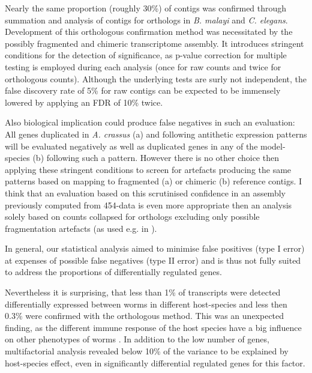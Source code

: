 Nearly the same proportion (roughly 30\%) of contigs was confirmed
through summation and analysis of contigs for orthologs in
\textit{B. malayi} and \textit{C. elegans}. Development of this
orthologous confirmation method was necessitated by the possibly
fragmented and chimeric transcriptome assembly. It introduces
stringent conditions for the detection of significance, as p-value
correction for multiple testing is employed during each analysis (once
for raw counts and twice for orthologous counts). Although the
underlying tests are surly not independent, the false discovery rate
of 5\% for raw contigs can be expected to be immensely lowered by
applying an FDR of 10\% twice.

Also biological implication could produce false negatives in such an
evaluation: All genes duplicated in \textit{A. crassus} (a) and
following antithetic expression patterns will be evaluated negatively
as well as duplicated genes in any of the model-species (b) following
such a pattern. However there is no other choice then applying these
stringent conditions to screen for artefacts producing the same
patterns based on mapping to fragmented (a) or chimeric (b) reference
contigs. I think that an evaluation based on this scrutinised
confidence in an assembly previously computed from 454-data is even
more appropriate then an analysis solely based on counts collapsed for
orthologs excluding only possible fragmentation artefacts (as used
e.g. in \cite{pmid22084086}).

In general, our statistical analysis aimed to minimise false positives
(type I error) at expenses of possible false negatives (type II error)
and is thus not fully suited to address the proportions of
differentially regulated genes.

Nevertheless it is surprising, that less than 1\% of transcripts were
detected differentially expressed between worms in different
host-species and less then 0.3\% were confirmed with the orthologous
method. This was an unexpected finding, as the different immune
response of the host species have a big influence on other phenotypes
of worms \cite{knopf_swimbladder_2006}. In addition to the low number
of genes, multifactorial analysis revealed below 10\% of the variance
to be explained by host-species effect, even in significantly
differential regulated genes for this factor.

